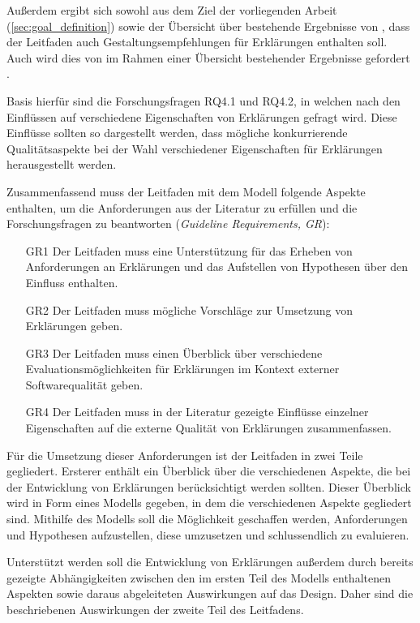 
Außerdem ergibt sich sowohl aus dem Ziel der vorliegenden Arbeit (\autoref{sec:goal_definition}) sowie der Übersicht über bestehende Ergebnisse von \citeauthor{waa_evaluating_2021}, dass der Leitfaden auch Gestaltungsempfehlungen für Erklärungen enthalten soll. Auch wird dies von \citeauthor{waa_evaluating_2021} im Rahmen einer Übersicht bestehender Ergebnisse gefordert \cite{waa_evaluating_2021}.

Basis hierfür sind die Forschungsfragen RQ4.1 und RQ4.2, in welchen nach den Einflüssen auf verschiedene Eigenschaften von Erklärungen gefragt wird. Diese Einflüsse sollten so dargestellt werden, dass mögliche konkurrierende Qualitätsaspekte bei der Wahl verschiedener Eigenschaften für Erklärungen herausgestellt werden.

\smallskip

Zusammenfassend muss der Leitfaden mit dem Modell folgende Aspekte enthalten, um die Anforderungen aus der Literatur zu erfüllen und die Forschungsfragen zu beantworten (\textit{Guideline Requirements, GR}):

\begin{enumerate}
    \item[GR1] Der Leitfaden muss eine Unterstützung für das Erheben von Anforderungen an Erklärungen und das Aufstellen von Hypothesen über den Einfluss enthalten.
    \item[GR2] Der Leitfaden muss mögliche Vorschläge zur Umsetzung von Erklärungen geben.
    \item[GR3] Der Leitfaden muss einen Überblick über verschiedene Evaluationsmöglichkeiten für Erklärungen im Kontext externer Softwarequalität geben.
    \item[GR4] Der Leitfaden muss in der Literatur gezeigte Einflüsse einzelner Eigenschaften auf die externe Qualität von Erklärungen zusammenfassen.
\end{enumerate}

\bigskip

Für die Umsetzung dieser Anforderungen ist der Leitfaden in zwei Teile gegliedert. Ersterer enthält ein Überblick über die verschiedenen Aspekte, die bei der Entwicklung von Erklärungen berücksichtigt werden sollten. Dieser Überblick wird in Form eines Modells gegeben, in dem die verschiedenen Aspekte gegliedert sind. Mithilfe des Modells soll die Möglichkeit geschaffen werden, Anforderungen und Hypothesen aufzustellen, diese umzusetzen und schlussendlich zu evaluieren.

Unterstützt werden soll die Entwicklung von Erklärungen außerdem durch bereits gezeigte Abhängigkeiten zwischen den im ersten Teil des Modells enthaltenen Aspekten sowie daraus abgeleiteten Auswirkungen auf das Design. Daher sind die beschriebenen Auswirkungen der zweite Teil des Leitfadens.

